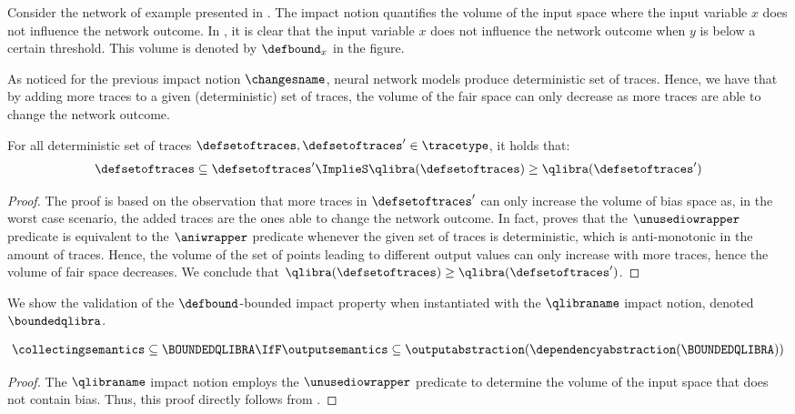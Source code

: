 \begin{example}
Consider the network of example presented in .
The \qlibraname{} impact notion quantifies the volume of the input space where the input variable $x$ does not influence the network outcome.
In , it is clear that the input variable $x$ does not influence the network outcome when $y$ is below a certain threshold. This volume is denoted by $\defbound_x$ in the figure.
\end{example}

As noticed for the previous impact notion $\changesname$, neural network models produce deterministic set of traces.
Hence, we have that by adding more traces to a given (deterministic) set of traces, the volume of the fair space can only decrease as more traces are able to change the network outcome.

\begin{lemma}
For all deterministic set of traces $\defsetoftraces, \defsetoftraces'\in\tracetype$, it holds that:
  \begin{align*}
    \defsetoftraces \subseteq \defsetoftraces' \ImplieS \qlibra(\defsetoftraces) \ge \qlibra(\defsetoftraces')
  \end{align*}
\end{lemma}
\begin{proof}
  The proof is based on the observation that more traces in $\defsetoftraces'$ can only increase the volume of bias space as, in the worst case scenario, the added traces are the ones able to change the network outcome.
  In fact,  proves that the $\unusediowrapper$ predicate is equivalent to the $\aniwrapper$ predicate whenever the given set of traces is deterministic, which is anti-monotonic in the amount of traces.
  Hence, the volume of the set of points leading to different output values can only increase with more traces, hence the volume of fair space decreases.
  We conclude that $\qlibra(\defsetoftraces) \ge \qlibra(\defsetoftraces')$.
\end{proof}

We show the validation of the $\defbound$-bounded impact property when instantiated with the $\qlibraname$ impact notion,
denoted $\boundedqlibra$.

\begin{lemma}
  \begin{align*}
    \collectingsemantics \subseteq \BOUNDEDQLIBRA \IfF \outputsemantics \subseteq \outputabstraction(\dependencyabstraction(\BOUNDEDQLIBRA))
  \end{align*}
\end{lemma}
\begin{proof}
  The $\qlibraname$ impact notion employs the $\unusediowrapper$ predicate to determine the volume of the input space that does not contain bias.
  Thus, this proof directly follows from .
\end{proof}

